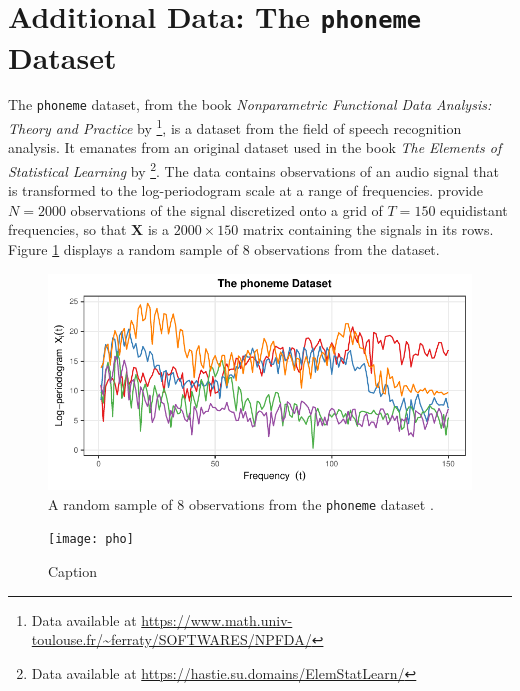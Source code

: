 \section{Additional Data: The \texttt{phoneme} Dataset}\label{sec:additional-data}

The \texttt{phoneme} dataset, from the book \emph{Nonparametric Functional Data Analysis: Theory and Practice} by \textcite{ferraty_nonparametric_2006}\footnote{Data available at \url{https://www.math.univ-toulouse.fr/~ferraty/SOFTWARES/NPFDA/}}, is a dataset from the field of speech recognition analysis.
It emanates from an original dataset used in the book \emph{The Elements of Statistical Learning} by \textcite{hastie_elements_2009}\footnote{Data available at \url{https://hastie.su.domains/ElemStatLearn/}}.
The data contains observations of an audio signal that is transformed to the log-periodogram scale at a range of frequencies.
\textcite{ferraty_nonparametric_2006} provide $N=2000$ observations of the signal discretized onto a grid of $T=150$ equidistant frequencies, so that $\mathbf{X}$ is a $2000\times 150$ matrix containing the signals in its rows.
Figure \ref{fig:phoneme} displays a random sample of $8$ observations from the dataset.

\begin{figure}[h]
    \centering
    \includegraphics[width=0.75\linewidth]{figures/phoneme.pdf}
    \caption{A random sample of $8$ observations from the \texttt{phoneme} dataset \parencite{hastie_elements_2009, ferraty_nonparametric_2006}.}
    \label{fig:phoneme}
\end{figure}


\begin{figure}
    \centering
    \texttt{[image: pho]}
    \caption{Caption}
    \label{fig:enter-label}
\end{figure}